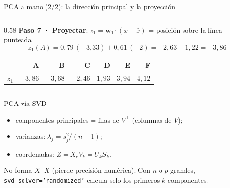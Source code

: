 \documentclass[aspectratio=169,12pt]{beamer}
\newcommand{\hrow}{\rowcolor{mlcream}}
\renewcommand{\arraystretch}{1.15}
\begin{document}
\begin{frame}{PCA a mano (2/2): la dirección principal y la proyección}
\begin{columns}[T]
\begin{column}{0.58\textwidth}
      \textbf{Paso 7 · Proyectar}: $z_1 = \mathbf w_1 \cdot (x - \bar x)$ = posición sobre la línea punteada
      \[ z_1(A) = 0{,}79\,(-3{,}33) + 0{,}61\,(-2) = -2{,}63 - 1{,}22 = -3{,}86 \]
      \setlength{\tabcolsep}{4pt}\renewcommand{\arraystretch}{1.05}
      \centering
      \begin{tabular}{@{}l r r r r r r@{}}
        \toprule
        \hrow & A & B & C & D & E & F \\
        \midrule
        $z_1$ & $-3{,}86$ & $-3{,}68$ & $-2{,}46$ & $1{,}93$ & $3{,}94$ & $4{,}12$ \\
        \bottomrule
      \end{tabular}
    \end{column}
  \end{columns}
\end{frame}

\begin{frame}{PCA vía SVD}
  \centering
  \vspace{6pt}
  \raggedright\small
  \begin{itemize}
    \item componentes principales = filas de $V^\top$ (columnas de $V$);
    \item varianzas: $\lambda_j = s_j^2 / (n-1)$;
    \item coordenadas: $Z = X_c V_k = U_k S_k$.
  \end{itemize}
  \begin{goldbox}
    \small No forma $X^\top X$ (pierde precisión numérica). Con $n$ o $p$ grandes, \texttt{svd\_solver='randomized'} calcula solo los primeros $k$ componentes.
  \end{goldbox}
\end{frame}
\end{document}
